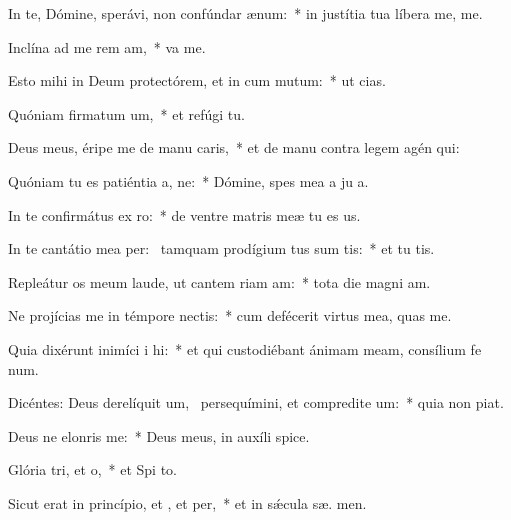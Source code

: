 \item In te, Dómine, sperávi, non confúndar  ænum:~* in justítia tua líbera me,   me.
\item Inclína ad me rem am,~*  va me.
\item Esto mihi in Deum protectórem, et in cum mutum:~* ut   cias.
\item Quóniam firmatum um,~* et refúgi   tu.
\item Deus meus, éripe me de manu caris,~* et de manu contra legem agén  qui:
\item Quóniam tu es patiéntia a, ne:~* Dómine, spes mea a ju a.
\item In te confirmátus  ex ro:~* de ventre matris meæ tu es  us.
\item In te cantátio mea per:~\pscross{} tamquam prodígium tus sum tis:~* et tu  tis.
\item Repleátur os meum laude, ut cantem riam am:~* tota die magni am.
\item Ne projícias me in témpore nectis:~* cum defécerit virtus mea,  quas me.
\item Quia dixérunt inimíci i hi:~* et qui custodiébant ánimam meam, consílium fe  num.
\item Dicéntes: Deus derelíquit um,~\pscross{} persequímini, et compredite um:~* quia non   piat.
\item Deus ne elonris  me:~* Deus meus, in auxíli  spice.
\item Glória tri, et o,~* et Spi to.
\item Sicut erat in princípio, et , et per,~* et in sǽcula sæ. men.
